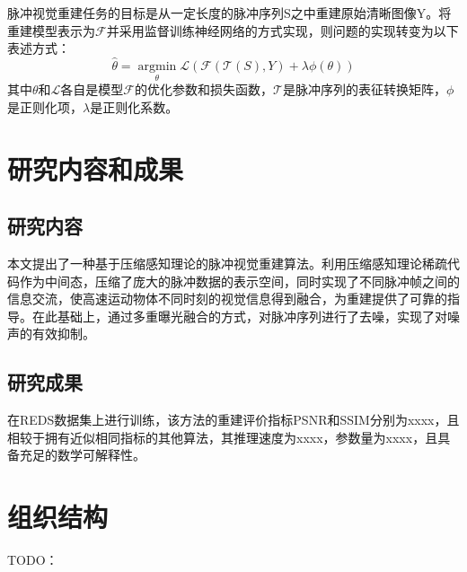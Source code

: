 脉冲视觉重建任务的目标是从一定长度的脉冲序列S之中重建原始清晰图像Y。将重建模型表示为$\mathcal{F}$并采用监督训练神经网络的方式实现，则问题的实现转变为以下表述方式：
\begin{equation}
  \label{eq:3}
  \hat{\theta} = \mathop{\arg\min}\limits_{\theta} \mathcal{L}(\mathcal{F}(\mathcal{T}(S),Y) + \lambda \phi(\theta))
\end{equation}
其中$\theta$和$\mathcal{L}$各自是模型$\mathcal{F}$的优化参数和损失函数，$\mathcal{T}$是脉冲序列的表征转换矩阵，$\phi$是正则化项，$\lambda$是正则化系数。
\section{研究内容和成果}
\subsection{研究内容}
本文提出了一种基于压缩感知理论的脉冲视觉重建算法。利用压缩感知理论稀疏代码作为中间态，压缩了庞大的脉冲数据的表示空间，同时实现了不同脉冲帧之间的信息交流，使高速运动物体不同时刻的视觉信息得到融合，为重建提供了可靠的指导。在此基础上，通过多重曝光融合的方式，对脉冲序列进行了去噪，实现了对噪声的有效抑制。
\subsection{研究成果}
在REDS数据集上进行训练，该方法的重建评价指标PSNR和SSIM分别为xxxx，且相较于拥有近似相同指标的其他算法，其推理速度为xxxx，参数量为xxxx，且具备充足的数学可解释性。
\section{组织结构}
TODO：



